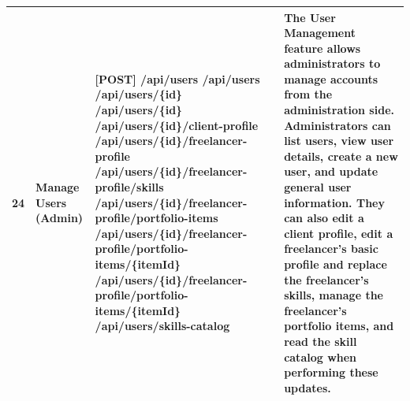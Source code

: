 \begin{longtable}{|C{0.7cm}|L{2.6cm}|S{6.6cm}|L{5.2cm}|}
24
&
\textbf{Manage Users (Admin)}
&
[POST] /\allowbreak{}api/\allowbreak{}users \newline
[GET] /\allowbreak{}api/\allowbreak{}users \newline
[GET] /\allowbreak{}api/\allowbreak{}users/\allowbreak{}\{id\} \newline
[PATCH] /\allowbreak{}api/\allowbreak{}users/\allowbreak{}\{id\} \newline
[PATCH] /\allowbreak{}api/\allowbreak{}users/\allowbreak{}\{id\}/\allowbreak{}client-profile \newline
[PATCH] /\allowbreak{}api/\allowbreak{}users/\allowbreak{}\{id\}/\allowbreak{}freelancer-profile \newline
[PUT] /\allowbreak{}api/\allowbreak{}users/\allowbreak{}\{id\}/\allowbreak{}freelancer-profile/\allowbreak{}skills \newline
[POST] /\allowbreak{}api/\allowbreak{}users/\allowbreak{}\{id\}/\allowbreak{}freelancer-profile/\allowbreak{}portfolio-items \newline
[PATCH] /\allowbreak{}api/\allowbreak{}users/\allowbreak{}\{id\}/\allowbreak{}freelancer-profile/\allowbreak{}portfolio-items/\allowbreak{}\{itemId\} \newline
[DELETE] /\allowbreak{}api/\allowbreak{}users/\allowbreak{}\{id\}/\allowbreak{}freelancer-profile/\allowbreak{}portfolio-items/\allowbreak{}\{itemId\} \newline
[GET] /\allowbreak{}api/\allowbreak{}users/\allowbreak{}skills-catalog
&
The User Management feature allows administrators to manage accounts from the administration side. Administrators can list users, view user details, create a new user, and update general user information. They can also edit a client profile, edit a freelancer's basic profile and replace the freelancer's skills, manage the freelancer's portfolio items, and read the skill catalog when performing these updates.
\\ \hline


\end{longtable}

